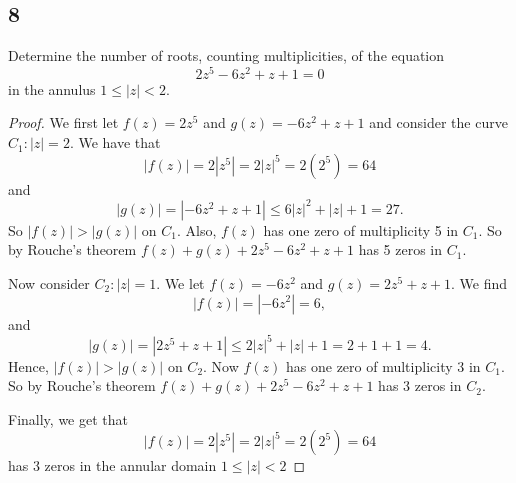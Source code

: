 \documentclass{article}
\begin{document}
\subsection*{8}
Determine the number of roots, counting multiplicities, of the equation
\begin{equation*}
    2z^5 - 6z^2 + z + 1 = 0
\end{equation*}
in the annulus $1 \leq |z| < 2$.

\begin{proof}
    We first let $f(z) = 2z^5$ and $g(z) = -6z^2 + z + 1$ and consider the curve
    $C_1: |z| = 2$. We have that
    \begin{equation*}
        |f(z)| = 2|z^5| = 2|z|^5 = 2(2^5) = 64
    \end{equation*}
    and
    \begin{equation*}
        |g(z)| = |-6z^2 + z + 1| \leq 6|z|^2 + |z| + 1 = 27.
    \end{equation*}
    So $|f(z)| > |g(z)|$ on $C_1$. Also, $f(z)$ has one zero of multiplicity
    5 in $C_1$. So by Rouche's theorem
    $f(z) + g(z) + 2z^5 - 6z^2 + z + 1$ has 5 zeros in $C_1$.

    Now consider $C_2: |z| = 1$. We let $f(z) = -6z^2$ and $g(z) = 2z^5 + z + 1$.
    We find
    \begin{equation*}
        |f(z)| = |-6z^2| = 6,
    \end{equation*}
    and
    \begin{equation*}
        |g(z)| = |2z^5 + z + 1| \leq 2|z|^5 + |z| + 1 = 2 + 1 +1 = 4.
    \end{equation*}
    Hence, $|f(z)| > |g(z)|$ on $C_2$. Now $f(z)$ has one zero of multiplicity
    3 in $C_1$. So by Rouche's theorem
    $f(z) + g(z) + 2z^5 - 6z^2 + z + 1$ has 3 zeros in $C_2$.

    Finally, we get that
    \begin{equation*}
        |f(z)| = 2|z^5| = 2|z|^5 = 2(2^5) = 64
    \end{equation*}
    has 3 zeros in the annular domain $1 \leq |z| < 2$

\end{proof}
\end{document}
